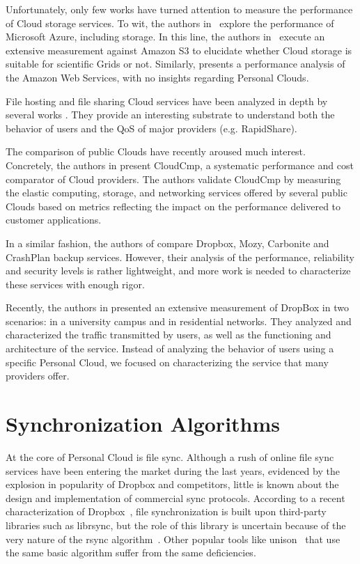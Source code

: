 Unfortunately, only few works have turned attention to measure the performance
of Cloud storage services. To wit, the authors in~\cite{early_experiences_azure}
explore the performance of Microsoft Azure,
including storage. In this line, the authors in~\cite{s3_grids} execute an extensive
measurement against Amazon S3 to elucidate whether Cloud storage is suitable
for scientific Grids or not.
Similarly, \cite{bergen2011client} presents a performance 
analysis of the Amazon Web Services, with no
insights regarding Personal Clouds.

File hosting and file sharing Cloud services have been analyzed in depth
by several works \cite{imc_rapidshare, one_click_hosting}.
They provide an interesting substrate to understand both
the behavior of users and the QoS of major providers (e.g. RapidShare).

The comparison of public Clouds have recently aroused much
interest. Concretely, the authors in \cite{cloudcmp} present CloudCmp, a systematic
performance and cost comparator of Cloud providers.
The authors validate CloudCmp by measuring the elastic computing, 
storage, and networking services offered by several
public Clouds based on metrics reflecting the impact 
on the performance delivered to customer applications.

In a similar fashion, the authors of \cite{hu2010good} compare Dropbox, Mozy, 
Carbonite and CrashPlan backup services. However, their analysis of 
the performance, reliability and security levels is rather lightweight, and
more work is needed to characterize these services with enough rigor.

Recently, the authors in \cite{drago2012inside} presented an
extensive measurement of DropBox in two scenarios: in a university
campus and in residential networks. They analyzed and characterized the 
traffic transmitted by users, as well as the
functioning and architecture of the service. Instead of analyzing the behavior
of users using a specific Personal Cloud, we focused on
characterizing the service that many providers offer.

\section{Synchronization Algorithms}

At the core of Personal Cloud is file sync. Although a rush of online file sync services have
been entering the market during the last years, evidenced by the explosion in popularity of
Dropbox and competitors, little is known about the design and implementation of commercial
sync protocols. According to a recent characterization of Dropbox~\cite{drago2012inside}, file synchronization
is built upon third-party libraries such as librsync, but the role of this library is uncertain
because of the very nature of the rsync algorithm~\cite{tridgell96rsync}. Other popular tools like 
unison~\cite{unison} that use the same basic algorithm suffer from the same deficiencies.


